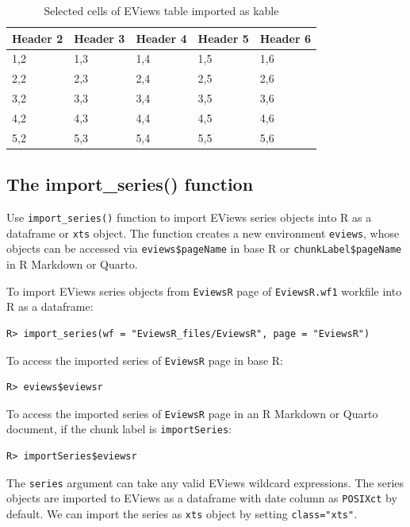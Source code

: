 \begin{table}

\caption{\label{tab:tbl-importKable1}Selected cells of EViews table imported as kable}
\centering
\begin{tabular}[t]{l|l|l|l|l}
\hline
Header 2 & Header 3 & Header 4 & Header 5 & Header 6\\
\hline
1,2 & 1,3 & 1,4 & 1,5 & 1,6\\
\hline
2,2 & 2,3 & 2,4 & 2,5 & 2,6\\
\hline
3,2 & 3,3 & 3,4 & 3,5 & 3,6\\
\hline
4,2 & 4,3 & 4,4 & 4,5 & 4,6\\
\hline
5,2 & 5,3 & 5,4 & 5,5 & 5,6\\
\hline
\end{tabular}
\end{table}

\hypertarget{the-import_series-function}{%
\subsection{The import\_series() function}\label{the-import_series-function}}

Use \texttt{import\_series()} function to import EViews series objects into R as a dataframe or \texttt{xts} object. The function creates a new environment \texttt{eviews}, whose objects can be accessed via \texttt{eviews\$pageName} in base R or \texttt{chunkLabel\$pageName} in R Markdown or Quarto.

To import EViews series objects from \texttt{EviewsR} page of \texttt{EviewsR.wf1} workfile into R as a dataframe:

\begin{verbatim}
R> import_series(wf = "EviewsR_files/EviewsR", page = "EviewsR")
\end{verbatim}

To access the imported series of \texttt{EviewsR} page in base R:

\begin{verbatim}
R> eviews$eviewsr
\end{verbatim}

To access the imported series of \texttt{EviewsR} page in an R Markdown or Quarto document, if the chunk label is \texttt{importSeries}:

\begin{verbatim}
R> importSeries$eviewsr
\end{verbatim}

The \texttt{series} argument can take any valid EViews wildcard expressions. The series objects are imported to EViews as a dataframe with date column as \texttt{POSIXct} by default. We can import the series as \texttt{xts} object by setting \texttt{class="xts"}.

